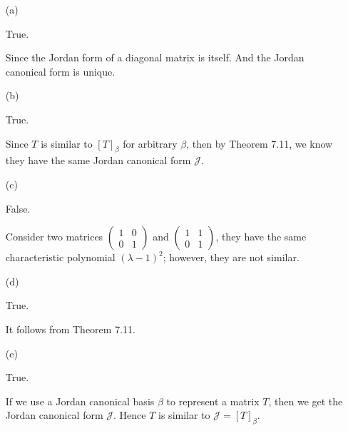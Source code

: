 \begin{Exercise}
\begin{enumerate}[(a)]
\item[(a)]
\begin{answer}
True.
\end{answer}
\begin{solution}
Since the Jordan form of a diagonal matrix is itself. And the Jordan canonical form is unique.
\end{solution}

\item[(b)]
\begin{answer}
True.
\end{answer}
\begin{solution}
Since $T$ is similar to $[T]_{\beta}$ for arbitrary $\beta$, then by Theorem 7.11, we know they have the same Jordan canonical form $\mathcal{J}$.
\end{solution}

\item[(c)]
\begin{answer}
False.
\end{answer}
\begin{solution}
Consider two matrices $\begin{pmatrix}
1 & 0 \\
0 & 1 
\end{pmatrix}$ and $\begin{pmatrix}
1 & 1 \\
0 & 1
\end{pmatrix}$, they have the same characteristic polynomial $(\lambda-1)^2$; however, they are not similar.
\end{solution}

\item[(d)]
\begin{answer}
True.
\end{answer}
\begin{solution}
It follows from Theorem 7.11.
\end{solution}

\item[(e)]
\begin{answer}
True.
\end{answer}
\begin{solution}
If we use a Jordan canonical basis $\beta$ to represent a matrix $T$, then we get the Jordan canonical form $\mathcal{J}$. Hence $T$ is similar to $\mathcal{J} = [T]_{\beta}$.
\end{solution}


\end{enumerate}
\end{Exercise}
